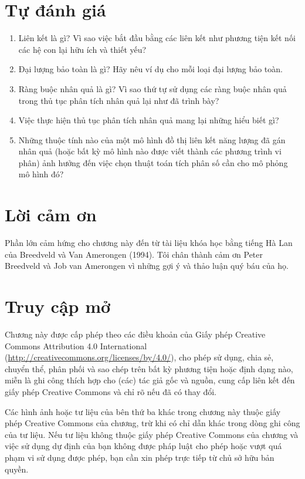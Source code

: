 \section{Tự đánh giá}
\begin{enumerate}
\item Liên kết là gì? Vì sao việc bắt đầu bằng các liên kết như phương tiện kết nối các hệ con lại hữu ích và thiết yếu?
\item Đại lượng bảo toàn là gì? Hãy nêu ví dụ cho mỗi loại đại lượng bảo toàn.
\item Ràng buộc nhân quả là gì? Vì sao thứ tự sử dụng các ràng buộc nhân quả trong thủ tục phân tích nhân quả lại như đã trình bày?
\item Việc thực hiện thủ tục phân tích nhân quả mang lại những hiểu biết gì?
\item Những thuộc tính nào của một mô hình đồ thị liên kết năng lượng đã gán nhân quả (hoặc bất kỳ mô hình nào được viết thành các phương trình vi phân) ảnh hưởng đến việc chọn thuật toán tích phân số cần cho mô phỏng mô hình đó?
\end{enumerate}

\section*{Lời cảm ơn}
Phần lớn cảm hứng cho chương này đến từ tài liệu khóa học bằng tiếng Hà Lan của Breedveld và Van Amerongen (1994). Tôi chân thành cảm ơn Peter Breedveld và Job van Amerongen vì những gợi ý và thảo luận quý báu của họ.

\section*{Truy cập mở}
Chương này được cấp phép theo các điều khoản của Giấy phép Creative Commons Attribution 4.0 International (\url{http://creativecommons.org/licenses/by/4.0/}), cho phép sử dụng, chia sẻ, chuyển thể, phân phối và sao chép trên bất kỳ phương tiện hoặc định dạng nào, miễn là ghi công thích hợp cho (các) tác giả gốc và nguồn, cung cấp liên kết đến giấy phép Creative Commons và chỉ rõ nếu đã có thay đổi.

Các hình ảnh hoặc tư liệu của bên thứ ba khác trong chương này thuộc giấy phép Creative Commons của chương, trừ khi có chỉ dẫn khác trong dòng ghi công của tư liệu. Nếu tư liệu không thuộc giấy phép Creative Commons của chương và việc sử dụng dự định của bạn không được pháp luật cho phép hoặc vượt quá phạm vi sử dụng được phép, bạn cần xin phép trực tiếp từ chủ sở hữu bản quyền.
